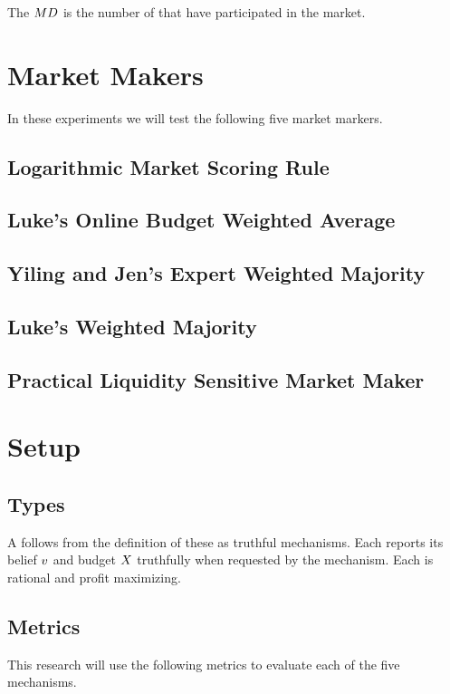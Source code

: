 The  $MD$ is the number of  that have participated in the market.\\

\section{Market Makers}
In these experiments we will test the following five market markers.
\subsection{Logarithmic Market Scoring Rule}
\subsection{Luke's Online Budget Weighted Average}
\subsection{Yiling and Jen's Expert Weighted Majority}
\subsection{Luke's Weighted Majority}
\subsection{Practical Liquidity Sensitive Market Maker}

\section{Setup}

\subsection{Types}
A  follows from the definition of these  as truthful
mechanisms. Each  reports its belief $v$ and budget $X$
truthfully when requested by the mechanism. Each  is rational and profit
maximizing.

\subsection{Metrics}
This research will use the following metrics to evaluate each of the five mechanisms.
